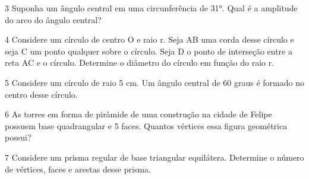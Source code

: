 \num{3} Suponha um ângulo central em uma circunferência de 31°. Qual é a
amplitude do arco do ângulo central?


\num{4} Considere um círculo de centro O e raio r. Seja AB uma corda desse
círculo e seja C um ponto qualquer sobre o círculo. Seja D o ponto de
interseção entre a reta AC e o círculo. Determine o diâmetro do círculo
em função do raio r.


\num{5} Considere um círculo de raio 5 cm. Um ângulo central de 60 graus é
formado no centro desse círculo.


\num{6} As torres em forma de pirâmide de uma construção na cidade de Felipe
possuem base quadrangular e 5 faces. Quantos vértices essa figura
geométrica possui?


\num{7} Considere um prisma regular de base triangular equilátera. Determine
o número de vértices, faces e arestas desse prisma.

